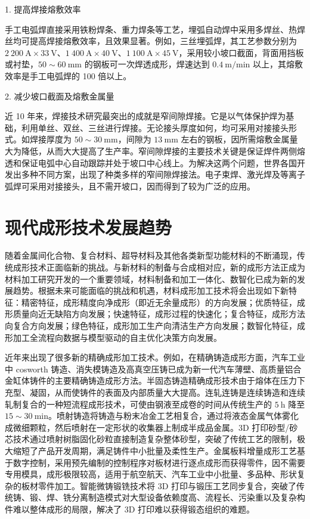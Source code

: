 \documentclass[UTF8]{ctexbook}
\newcommand{\◎}{\ensuremath{\bigcirc}}
\begin{document}
1. 提高焊接熔敷效率

手工电弧焊直接采用铁粉焊条、重力焊条等工艺，埋弧自动焊中采用多焊丝、热焊丝均可提高焊接熔敷效率，且效果显著。例如，三丝埋弧焊，其工艺参数分别为 $2~200~\mathrm{A} \times 33~\mathrm{V}$、$1~400~\mathrm{A} \times 40~\mathrm{V}$、$1~100~\mathrm{A} \times 45~\mathrm{V}$，采用较小坡口截面，背面用挡板或衬垫，$50 \sim 60~\mathrm{mm}$ 的钢板可一次焊透成形，焊速达到 $0.4~\mathrm{m/min}$ 以上，其熔敷效率是手工电弧焊的 100 倍以上。

2. 减少坡口截面及熔敷金属量

近 10 年来，焊接技术研究最突出的成就是窄间隙焊接。它是以气体保护焊为基础，利用单丝、双丝、三丝进行焊接。无论接头厚度如何，均可采用对接接头形式。如焊接厚度为 $50 \sim 30~\mathrm{mm}$，间隙为 $13~\mathrm{mm}$ 左右的钢板，因所需熔敷金属量大为降低，从而大大提高了生产率。窄间隙焊接的主要技术关键是保证焊件两侧熔透和保证电弧中心自动跟踪并处于坡口中心线上。为解决这两个问题，世界各国开发出多种不同方案，出现了种类多样的窄间隙焊接法。电子束焊、激光焊及等离子弧焊可采用对接接头，且不需开坡口，因而得到了较为广泛的应用。

\section{现代成形技术发展趋势}

随着金属间化合物、复合材料、超导材料及其他各类新型功能材料的不断涌现，传统成形技术正面临新的挑战。与新材料的制备与合成相对应，新的成形方法正成为材料加工研究开发的一个重要领域，材料制备和加工一体化、数智化已成为新的发展趋势。根据未来可能面临的挑战和机遇，材料成形加工技术将会出现如下新特征：精密特征，成形精度向净成形（即近无余量成形）的方向发展；优质特征，成形质量向近无缺陷方向发展；快速特征，成形过程的快速化；复合特征，成形方法向复合方向发展；绿色特征，成形加工生产向清洁生产方向发展；数智化特征，成形加工全流程向数据与模型驱动的自主优化决策方向发展。

近年来出现了很多新的精确成形加工技术。例如，在精确铸造成形方面，汽车工业中 cosworth 铸造、消失模铸造及高真空压铸已成为新一代汽车薄壁、高质量铝合金缸体铸件的主要精确铸造成形方法。半固态铸造精确成形技术由于熔体在压力下充型、凝固，从而使铸件的表面及内部质量大大提高。连轧连铸是连续铸造和连续轧制复合的一种短流程成形技术，可使由钢液至成卷的时间从传统生产的 $5~\mathrm{h}$ 降至 $15 \sim 30~\mathrm{min}$。喷射铸造将铸造与粉末冶金工艺相复合，通过将液态金属气体雾化成微细颗粒，然后喷射在一定形状的收集器上制成半成品金属。3D 打印砂型/砂芯技术通过喷射树脂固化砂粒直接制造复杂整体砂型，突破了传统工艺的限制，极大缩短了产品开发周期，满足铸件中小批量及柔性生产。金属板料增量成形工艺基于数字控制，采用预先编制的控制程序对板材进行逐点成形而获得零件，因不需要专用模具，成形极限较高，适用于航空航天、汽车工业中小批量、多品种、形状复杂的板材零件加工。智能微铸锻铣技术将 3D 打印与锻压工艺同步复合，突破了传统铸、锻、焊、铣分离制造模式对大型设备依赖度高、流程长、污染重以及复杂构件难以整体成形的局限，解决了 3D 打印难以获得锻态组织的难题。
\end{document}
